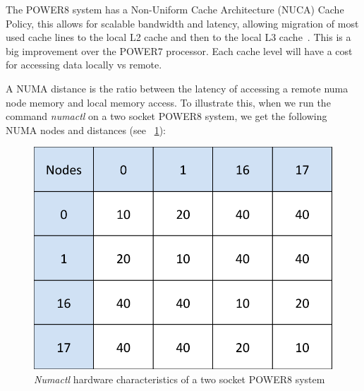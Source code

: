 The POWER8 system has a Non-Uniform Cache Architecture (NUCA) Cache Policy, this allows for scalable bandwidth and latency, allowing migration of most used cache lines to the local L2 cache and then to the local L3 cache~\cite{IBM_P8}. This is a big improvement over the POWER7 processor.  Each cache level will have a cost for accessing data locally vs remote.  

A NUMA distance is the ratio between the latency of accessing  a remote numa node memory and local memory access. To illustrate this,  when we run the command \textit{numactl} on a two socket POWER8 system, we get the following 
NUMA nodes and distances (see ~\ref{fig:crest}): 

\begin{figure}[h]
  \centering
  \includegraphics[height=0.3\textwidth]{./Images/crest.pdf}
       \caption{\textit{Numactl} hardware characteristics of a two socket POWER8 system}
       \label{fig:crest}
\end{figure}




 
